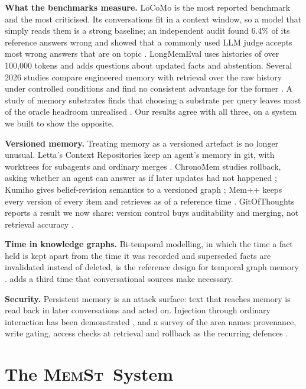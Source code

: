 \documentclass[11pt,letterpaper]{article}
\newcommand{\memst}{\textsc{MemSt}}
\begin{document}
\textbf{What the benchmarks measure.} LoCoMo \citep{maharana2024evaluating} is the most reported benchmark and the most criticised. Its conversations fit in a context window, so a model that simply reads them is a strong baseline; an independent audit found 6.4\% of its reference answers wrong and showed that a commonly used LLM judge accepts most wrong answers that are on topic \citep{locomoaudit}. LongMemEval \citep{wu2024longmemeval} uses histories of over 100,000 tokens and adds questions about updated facts and abstention. Several 2026 studies compare engineered memory with retrieval over the raw history under controlled conditions and find no consistent advantage for the former \citep{bao2026naiverag, zhou2026explicit}. A study of memory substrates finds that choosing a substrate per query leaves most of the oracle headroom unrealised \citep{huang2026harness}. Our results agree with all three, on a system we built to show the opposite.

\textbf{Versioned memory.} Treating memory as a versioned artefact is no longer unusual. Letta's Context Repositories keep an agent's memory in git, with worktrees for subagents and ordinary merges \citep{lettacontextrepos}. ChronoMem studies rollback, asking whether an agent can answer as if later updates had not happened \citep{su2026chronomem}; Kumiho gives belief-revision semantics to a versioned graph \citep{park2026kumiho}; Mem++ keeps every version of every item and retrieves as of a reference time \citep{yehia2026mempp}. GitOfThoughts reports a result we now share: version control buys auditability and merging, not retrieval accuracy \citep{shekar2026gitofthoughts}.

\textbf{Time in knowledge graphs.} Bi-temporal modelling, in which the time a fact held is kept apart from the time it was recorded and superseded facts are invalidated instead of deleted, is the reference design for temporal graph memory \citep{rasmussen2025zep}.  adds a third time that conversational sources make necessary.

\textbf{Security.} Persistent memory is an attack surface: text that reaches memory is read back in later conversations and acted on. Injection through ordinary interaction has been demonstrated \citep{dong2025minja}, and a survey of the area names provenance, write gating, access checks at retrieval and rollback as the recurring defences \citep{lin2026memsecurity}.

\section{The \memst~System}
\label{sec:system}
\end{document}
